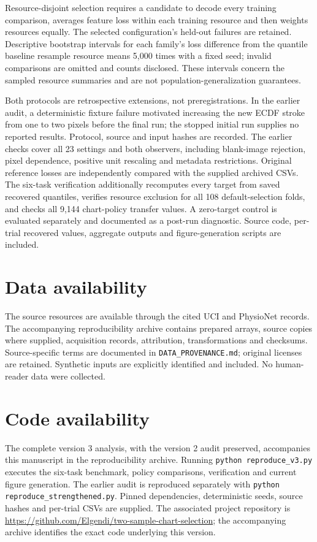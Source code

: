 \documentclass[11pt]{article}
\begin{document}
Resource-disjoint selection requires a candidate to decode every training comparison, averages feature loss within each training resource and then weights resources equally. The selected configuration's held-out failures are retained. Descriptive bootstrap intervals for each family's loss difference from the quantile baseline resample resource means 5,000 times with a fixed seed; invalid comparisons are omitted and counts disclosed. These intervals concern the sampled resource summaries and are not population-generalization guarantees.

Both protocols are retrospective extensions, not preregistrations. In the earlier audit, a deterministic fixture failure motivated increasing the new ECDF stroke from one to two pixels before the final run; the stopped initial run supplies no reported results. Protocol, source and input hashes are recorded. The earlier checks cover all 23 settings and both observers, including blank-image rejection, pixel dependence, positive unit rescaling and metadata restrictions. Original reference losses are independently compared with the supplied archived CSVs. The six-task verification additionally recomputes every target from saved recovered quantiles, verifies resource exclusion for all 108 default-selection folds, and checks all 9,144 chart-policy transfer values. A zero-target control is evaluated separately and documented as a post-run diagnostic. Source code, per-trial recovered values, aggregate outputs and figure-generation scripts are included.

\section*{Data availability}
The source resources are available through the cited UCI and PhysioNet records. The accompanying reproducibility archive contains prepared arrays, source copies where supplied, acquisition records, attribution, transformations and checksums. Source-specific terms are documented in \texttt{DATA\_PROVENANCE.md}; original licenses are retained. Synthetic inputs are explicitly identified and included. No human-reader data were collected.

\section*{Code availability}
The complete version 3 analysis, with the version 2 audit preserved, accompanies this manuscript in the reproducibility archive. Running \texttt{python reproduce\_v3.py} executes the six-task benchmark, policy comparisons, verification and current figure generation. The earlier audit is reproduced separately with \texttt{python reproduce\_strengthened.py}. Pinned dependencies, deterministic seeds, source hashes and per-trial CSVs are supplied. The associated project repository is \url{https://github.com/Elgendi/two-sample-chart-selection}; the accompanying archive identifies the exact code underlying this version.
\end{document}
